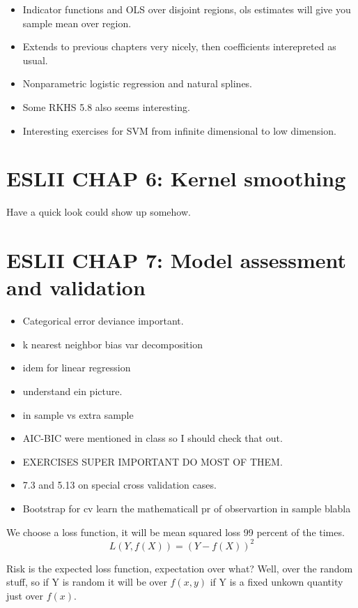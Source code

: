 \documentclass{article}
\begin{document}
\begin{itemize}
    \item Indicator functions and OLS over disjoint regions, ols estimates will give 
    you sample mean over region.
    \item Extends to previous chapters very nicely, then coefficients interepreted as usual. 
    \item Nonparametric logistic regression and natural splines.
    \item Some RKHS 5.8 also seems interesting.
    \item Interesting exercises for SVM from infinite dimensional to low dimension.
\end{itemize}

\section{ESLII CHAP 6: Kernel smoothing}
Have a quick look could show up somehow.



\section{ESLII CHAP 7: Model assessment and validation}

\begin{itemize}
    \item Categorical error deviance important.
    \item k nearest neighbor bias var decomposition 
    \item idem for linear regression
    \item understand ein picture.
    \item in sample vs extra sample 
    \item AIC-BIC were mentioned in class so I should check that out. 
    \item EXERCISES SUPER IMPORTANT DO MOST OF THEM.
    \item 7.3 and 5.13 on special cross validation cases.
    \item Bootstrap for cv learn the mathematicall pr of observartion in sample blabla
\end{itemize}

We choose a loss function, it will be mean squared loss 99 percent of the times. $$L(Y,f(X))=(Y-f(X))^2$$ 

Risk is the expected loss function, expectation over what? Well, over the random stuff, so if Y is random it will be over $f(x,y)$ if Y is a fixed unkown quantity just over $f(x)$.
\end{document}
